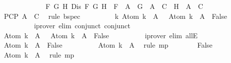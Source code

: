 \begin{isabellebody}
\ \ \ \ \ \ \ \ \ \ \ \ {\isasymand}\ {\isacharparenleft}{\isasymforall}F\ G\ H{\isachardot}\ Dis\ F\ G\ H\ {\isasymlongrightarrow}\ F\ {\isasymin}\ {\isacharquery}A\ {\isasymlongrightarrow}\ {\isacharbraceleft}G{\isacharbraceright}\ {\isasymunion}\ {\isacharquery}A\ {\isasymin}\ C\ {\isasymor}\ {\isacharbraceleft}H{\isacharbraceright}\ {\isasymunion}\ {\isacharquery}A\ {\isasymin}\ C{\isacharparenright}{\isachardoublequoteclose}\isanewline
\ \ \ \ \ \ \ \ \isamarkupfalse%
\ PCP\ {\isacartoucheopen}{\isacharquery}A\ {\isasymin}\ C{\isacartoucheclose}\ \isamarkupfalse%
\ {\isacharparenleft}rule\ bspec{\isacharparenright}\isanewline
\ \ \ \ \ \ \isamarkupfalse%
\ \isamarkupfalse%
\ {\isachardoublequoteopen}{\isasymforall}k{\isachardot}\ Atom\ k\ {\isasymin}\ {\isacharquery}A\ {\isasymlongrightarrow}\ \isactrlbold {\isasymnot}\ {\isacharparenleft}Atom\ k{\isacharparenright}\ {\isasymin}\ {\isacharquery}A\ {\isasymlongrightarrow}\ False{\isachardoublequoteclose}\isanewline
\ \ \ \ \ \ \ \ \isamarkupfalse%
\ {\isacharparenleft}iprover\ elim{\isacharcolon}\ conjunct{}\ conjunct{}{\isacharparenright}\isanewline
\ \ \ \ \ \ \isamarkupfalse%
\ \isamarkupfalse%
\ {\isachardoublequoteopen}Atom\ k\ {\isasymin}\ {\isacharquery}A\ {\isasymlongrightarrow}\ \isactrlbold {\isasymnot}\ {\isacharparenleft}Atom\ k{\isacharparenright}\ {\isasymin}\ {\isacharquery}A\ {\isasymlongrightarrow}\ False{\isachardoublequoteclose}\isanewline
\ \ \ \ \ \ \ \ \isamarkupfalse%
\ {\isacharparenleft}iprover\ elim{\isacharcolon}\ allE{\isacharparenright}\isanewline
\ \ \ \ \ \ \isamarkupfalse%
\ \isamarkupfalse%
\ {\isachardoublequoteopen}\isactrlbold {\isasymnot}{\isacharparenleft}Atom\ k{\isacharparenright}\ {\isasymin}\ {\isacharquery}A\ {\isasymlongrightarrow}\ False{\isachardoublequoteclose}\isanewline
\ \ \ \ \ \ \ \ \isamarkupfalse%
\ {\isacartoucheopen}Atom\ k\ {\isasymin}\ {\isacharquery}A{\isacartoucheclose}\ \isamarkupfalse%
\ {\isacharparenleft}rule\ mp{\isacharparenright}\isanewline
\ \ \ \ \ \ \isamarkupfalse%
\ {\isachardoublequoteopen}False{\isachardoublequoteclose}\isanewline
\ \ \ \ \ \ \ \ \isamarkupfalse%
\ {\isacartoucheopen}\isactrlbold {\isasymnot}{\isacharparenleft}Atom\ k{\isacharparenright}\ {\isasymin}\ {\isacharquery}A{\isacartoucheclose}\ \isamarkupfalse%
\ {\isacharparenleft}rule\ mp{\isacharparenright}\isanewline

\end{isabellebody}
